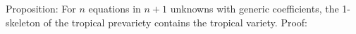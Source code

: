 \documentclass[12pt]{amsart}
\date{\today}
\author{Nathan Bliss \and Jan Verschelde}
\begin{document}
Proposition: For $n$ equations in $n+1$ unknowns with generic coefficients, the 1-skeleton of the tropical prevariety contains the tropical variety.
Proof:
\end{document}
